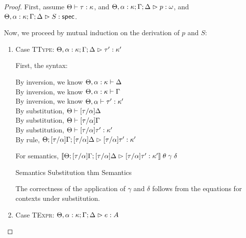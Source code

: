 \begin{proof}
First, assume $\judgeWK{\tau}{\kappa}$, and $\judgeA[\Theta, \alpha:\kappa; \Gamma;\Delta]{p}{\omega}$, and
$\judgeS[\Theta, \alpha:\kappa; \Gamma; \Delta]{S}$. 

Now, we proceed by mutual induction on the derivation of $p$ and $S$: 
\begin{enumerate}

\item Case \textsc{TType}: $\judgeA[\Theta, \alpha:\kappa; \Gamma;\Delta]{\tau'}{\kappa'}$

  First, the syntax:
  \begin{tabbedproof}
    \oo By inversion, we know $\judgectx{\Theta, \alpha:\kappa}{\Delta}$ \\
    \oo By inversion, we know $\judgectx{\Theta, \alpha:\kappa}{\Gamma}$ \\
    \oo By inversion, we know $\judgeWK[\Theta, \alpha]{\tau'}{\kappa'}$ \\
    \oo By substitution, $\judgectx{\Theta}{{[\tau/\alpha]}\Delta}$ \\
    \oo By substitution, $\judgectx{\Theta}{{[\tau/\alpha]}\Gamma}$ \\
    \oo By substitution, $\judgeWK{{[\tau/\alpha]}\tau'}{\kappa'}$ \\
    \oo By rule, $\judgeA[\Theta; {[\tau/\alpha]}\Gamma;{[\tau/\alpha]}\Delta]{{[\tau/\alpha]}\tau'}{\kappa'}$
  \end{tabbedproof}

  For semantics,     $\interp{\judgeA[\Theta; {[\tau/\alpha]}\Gamma;{[\tau/\alpha]}\Delta]{{[\tau/\alpha]}\tau'}{\kappa'}}\;\theta\;\gamma\;\delta$
  \begin{eqnproof}
          {Semantics}
          {Substitution thm}
          {Semantics}
  \end{eqnproof}
  The correctness of the application of $\gamma$ and $\delta$ follows from the equations for contexts
  under substitution. 

  \item Case \textsc{TExpr}: $\judgeA[\Theta, \alpha:\kappa; \Gamma; \Delta]{e}{A}$


\end{enumerate}
\end{proof}
